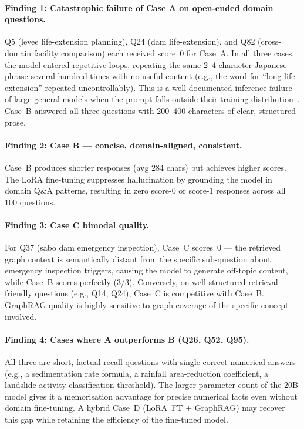 \documentclass[twocolumn]{article}
\begin{document}
\paragraph{Finding 1: Catastrophic failure of Case A on open-ended domain questions.}
Q5 (levee life-extension planning), Q24 (dam life-extension), and Q82 (cross-domain facility
comparison) each received score~0 for Case~A.
In all three cases, the model entered repetitive loops, repeating the same 2--4-character
Japanese phrase several hundred times with no useful content
(e.g., the word for ``long-life extension'' repeated uncontrollably).
This is a well-documented inference failure of large general models
when the prompt falls outside their training distribution~\cite{meta2024llama3}.
Case~B answered all three questions with 200--400 characters of clear, structured prose.

\paragraph{Finding 2: Case B --- concise, domain-aligned, consistent.}
Case~B produces shorter responses (avg 284 chars) but achieves higher scores.
The LoRA fine-tuning suppresses hallucination by grounding the model in domain Q\&A patterns,
resulting in zero score-0 or score-1 responses across all 100 questions.

\paragraph{Finding 3: Case C bimodal quality.}
For Q37 (sabo dam emergency inspection), Case~C scores~0 --- the retrieved graph context
is semantically distant from the specific sub-question about emergency inspection triggers,
causing the model to generate off-topic content, while Case~B scores perfectly (3/3).
Conversely, on well-structured retrieval-friendly questions (e.g., Q14, Q24),
Case~C is competitive with Case~B.
GraphRAG quality is highly sensitive to graph coverage of the specific concept involved.

\paragraph{Finding 4: Cases where A outperforms B (Q26, Q52, Q95).}
All three are short, factual recall questions with single correct numerical answers
(e.g., a sedimentation rate formula, a rainfall area-reduction coefficient, a landslide
activity classification threshold).
The larger parameter count of the 20B model gives it a memorisation advantage for
precise numerical facts even without domain fine-tuning.
A hybrid Case~D (LoRA~FT + GraphRAG) may recover this gap while retaining the efficiency
of the fine-tuned model.
\end{document}
